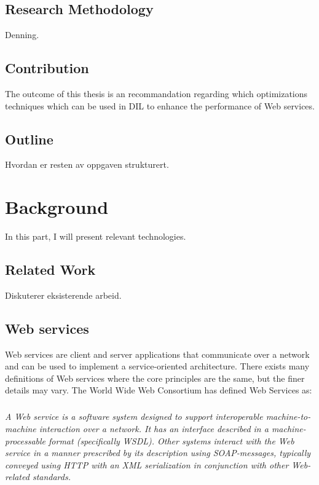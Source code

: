 \documentclass[USenglish]{ifimaster}
\begin{document}
\section{Research Methodology}
Denning.

\section{Contribution}
The outcome of this thesis is an recommandation regarding which optimizations
techniques which can be used in DIL to enhance the performance of Web services.
\section{Outline}
Hvordan er resten av oppgaven strukturert.


\chapter{Background}
In this part, I will present relevant technologies.
\section{Related Work}
Diskuterer eksisterende arbeid.



\section{Web services}
\label{web-services}
Web services are client and server applications that communicate over a network
and can be used to implement a service-oriented architecture. There exists many
definitions of Web services where the core principles are the same, but the
finer details may vary. The World Wide Web Consortium has defined Web Services
as\cite{wrc-web-service}:
\paragraph{}
\textit{
    A Web service is a software system designed to support interoperable
    machine-to-machine interaction over a network. It has an interface described in
    a machine-processable format (specifically WSDL). Other systems interact with
    the Web service in a manner prescribed by its description using SOAP-messages,
    typically conveyed using HTTP with an XML serialization in conjunction with
    other Web-related standards.
}
\end{document}
